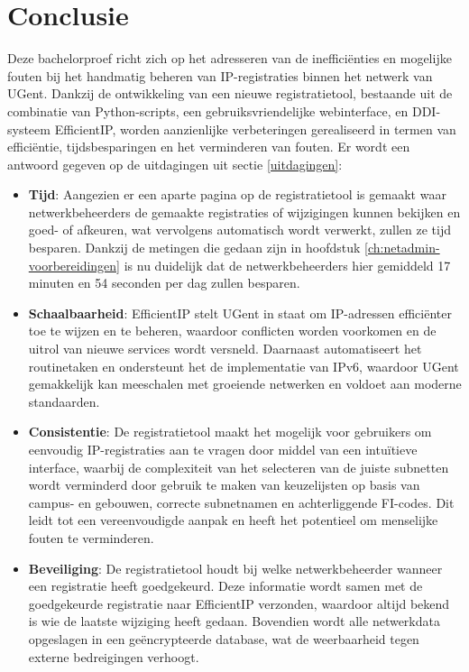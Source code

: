 
\chapter{Conclusie}%
\label{ch:conclusie}

Deze bachelorproef richt zich op het adresseren van de inefficiënties en mogelijke fouten bij het handmatig beheren van IP-registraties binnen het netwerk van UGent. Dankzij de ontwikkeling van een nieuwe registratietool, bestaande uit de combinatie van Python-scripts, een gebruiksvriendelijke webinterface, en DDI-systeem EfficientIP, worden aanzienlijke verbeteringen gerealiseerd in termen van efficiëntie, tijdsbesparingen en het verminderen van fouten.
Er wordt een antwoord gegeven op de uitdagingen uit sectie \ref{uitdagingen}:
\begin{itemize}[]
    \item \textbf{Tijd}: Aangezien er een aparte pagina op de registratietool is gemaakt waar netwerkbeheerders de gemaakte registraties of wijzigingen kunnen bekijken en goed- of afkeuren, wat vervolgens automatisch wordt verwerkt, zullen ze tijd besparen. Dankzij de metingen die gedaan zijn in hoofdstuk \ref{ch:netadmin-voorbereidingen} is nu duidelijk dat de netwerkbeheerders hier gemiddeld 17 minuten en 54 seconden per dag zullen besparen.
    \item \textbf{Schaalbaarheid}: EfficientIP stelt UGent in staat om IP-adressen efficiënter toe te wijzen en te beheren, waardoor conflicten worden voorkomen en de uitrol van nieuwe services wordt versneld. Daarnaast automatiseert het routinetaken en ondersteunt het de implementatie van IPv6, waardoor UGent gemakkelijk kan meeschalen met groeiende netwerken en voldoet aan moderne standaarden.
    \item \textbf{Consistentie}: De registratietool maakt het mogelijk voor gebruikers om eenvoudig IP-registraties aan te vragen door middel van een intuïtieve interface, waarbij de complexiteit van het selecteren van de juiste subnetten wordt verminderd door gebruik te maken van keuzelijsten op basis van campus- en gebouwen, correcte subnetnamen en achterliggende FI-codes. Dit leidt tot een vereenvoudigde aanpak en heeft het potentieel om menselijke fouten te verminderen.  
    \item \textbf{Beveiliging}: De registratietool houdt bij welke netwerkbeheerder wanneer een registratie heeft goedgekeurd. Deze informatie wordt samen met de goedgekeurde registratie naar EfficientIP verzonden, waardoor altijd bekend is wie de laatste wijziging heeft gedaan. Bovendien wordt alle netwerkdata opgeslagen in een geëncrypteerde database, wat de weerbaarheid tegen externe bedreigingen verhoogt.
\end{itemize}

